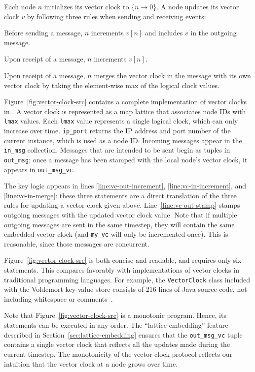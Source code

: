 Each node $n$ initializes its vector clock to $\{n \rightarrow 0\}$. A node
updates its vector clock $v$ by following three rules when sending and receiving
events:
\begin{compactenum}
\item
  Before sending a message, $n$ increments $v[n]$ and includes $v$ in the
  outgoing message.
\item
  Upon receipt of a message, $n$ increments $v[n]$.
\item
  Upon receipt of a message, $n$ merges the vector clock in the message with its
  own vector clock by taking the element-wise max of the logical clock values.
\end{compactenum}
Figure~\ref{fig:vector-clock-src} contains a complete implementation of vector
clocks in \lang. A vector clock is represented as a map lattice that associates
node IDs with \texttt{lmax} values. Each \texttt{lmax} value represents a single
logical clock, which can only increase over time. \texttt{ip\_port} returns the
IP address and port number of the current \lang instance, which is used as a
node ID. Incoming messages appear in the \texttt{in\_msg} collection. Messages
that are intended to be sent begin as tuples in \texttt{out\_msg}; once a
message has been stamped with the local node's vector clock, it appears in
\texttt{out\_msg\_vc}.

The key logic appears in lines \ref{line:vc-out-increment},
\ref{line:vc-in-increment}, and \ref{line:vc-in-merge}: these three statements
are a direct translation of the three rules for updating a vector clock given
above. Line~\ref{line:vc-out-stamp} stamps outgoing messages with the updated
vector clock value.  Note that if multiple outgoing messages are sent in the
same \lang timestep, they will contain the same embedded vector clock (and
\texttt{my\_vc} will only be incremented once). This is reasonable, since those
messages are concurrent.

Figure~\ref{fig:vector-clock-src} is both concise and readable, and requires
only six \lang statements. This compares favorably with implementations of
vector clocks in traditional programming languages. For example, the
\texttt{VectorClock} class included with the Voldemort key-value store consists
of 216 lines of Java source code, not including whitespace or
comments~\cite{voldemort-vector-clock}.

Note that Figure~\ref{fig:vector-clock-src} is a monotonic program. Hence, its
statements can be executed in any order. The ``lattice embedding'' feature
described in Section~\ref{sec:lattice-embedding} ensures that the
\texttt{out\_msg\_vc} tuple contains a single vector clock that reflects all the
updates made during the current timestep. The monotonicity of the vector clock
protocol reflects our intuition that the vector clock at a node grows over
time.%

